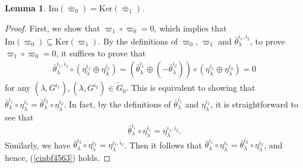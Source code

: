 \documentclass[11pt,reqno]{amsart}
\newtheorem{lemma}[theorem]{Lemma}
\theoremstyle{definition}
\begin{document}
\begin{lemma}\label{Firstgj}
$\mathrm{Im}(\bar{\varpi}_0) = \mathrm{Ker}(\bar{\varpi}_1)$.
\end{lemma}

\begin{proof}
First, we show that $\varpi_1 \circ \varpi_0 = 0$, which implies that $ \mathrm{Im}
(\varpi_0) \subseteq \mathrm{Ker}(\varpi_1)$. 
By the definitions of $\varpi_0$, $\varpi_1$ and $\bar\theta^{i_1, i_2}_{\lambda}$, to prove 
$\varpi_1 \circ \varpi_0 = 0$, it suffices to prove that 
\begin{align}\label{cinbf4563} 
\bar\theta^{i_1, i_2}_{\lambda} \circ 
( \eta^{i_1}_{\lambda} \oplus \eta^{i_2}_{\lambda} ) = 
(  \bar\theta^{i_1}_{\lambda} \oplus (-\bar\theta^{i_2}_{\lambda}) ) \circ 
( \eta^{i_1}_{\lambda} \oplus \eta^{i_2}_{\lambda} ) = 0
\end{align}
for any $(\lambda, G^{i_1}), 
(\lambda, G^{i_2}) \in \tilde{G}_0$.
This is equivalent to showing that
$\bar\theta^{i_1}_{\lambda} 
\circ \eta^{i_1}_{\lambda} = 
\bar\theta^{i_2}_{\lambda} \circ 
\eta^{i_2}_{\lambda}$. 
In fact, by
the definitions of $\bar\theta^{i_1}_{\lambda}$ and
$\eta^{i_1}_{\lambda}$, it is straightforward
to see that 
$$
\bar\theta^{i_1}_{\lambda} \circ \eta^{i_1}_{\lambda} = 
\eta^{i_1, i_2}_{\lambda}. 
$$ 
Similarly, we have $\bar\theta^{i_2}_{\lambda} \circ \eta^{i_2}_{\lambda} 
= \eta^{i_1, i_2}_{\lambda}$. 
Then it follows that
$\bar\theta^{i_1}_{\lambda} \circ \eta^{i_1}_{\lambda} 
= \bar\theta^{i_2}_{\lambda} \circ \eta^{i_2}_{\lambda}$, and
hence, (\ref{cinbf4563}) holds. 


\end{proof}
\end{document}
